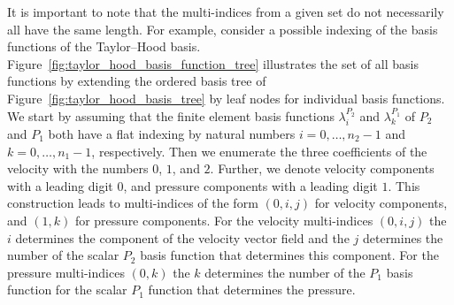 \documentclass[a4paper,10pt,headings=normal,bibliography=totoc]{scrartcl}
\begin{document}
It is important to note that the multi-indices from a given set do not necessarily
all have the same length.  For example, consider a possible indexing of the
basis functions of the Taylor--Hood basis.
Figure~\ref{fig:taylor_hood_basis_function_tree} illustrates the set of all basis
functions by extending the ordered basis tree of Figure~\ref{fig:taylor_hood_basis_tree}
by leaf nodes for individual basis functions.
We start by assuming that the finite element basis functions $\lambda_i^{P_2}$ and $\lambda_k^{P_1}$
of $P_2$ and $P_1$ both
have a flat indexing by natural numbers $i=0,\dots,n_2-1$ and $k=0,\dots,n_1-1$,
respectively.
Then we enumerate the three coefficients of the velocity
with the numbers $0$, $1$, and $2$.  Further, we denote velocity components with a leading digit $0$,
and pressure components with a leading digit $1$.
This construction leads to multi-indices of the form $(0,i,j)$ for velocity components, and $(1,k)$
for pressure components.
For the velocity multi-indices $(0,i,j)$ the $i$ determines the component
of the velocity vector field and the $j$ determines the number of the scalar $P_2$ basis
function that determines this component.
For the pressure multi-indices $(0,k)$ the $k$ determines the number of the $P_1$ basis
function for the scalar $P_1$ function that determines the pressure.
\end{document}

